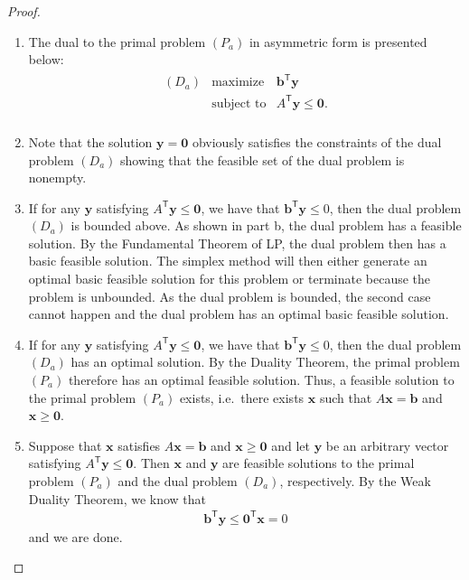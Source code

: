 \documentclass[12pt]{article}
\theoremstyle{definition}
\newcommand{\vc}[1]{\boldsymbol{#1}}
\newcommand{\tran}{\mathsf{T}}
\begin{document}
\begin{proof}
  \begin{enumerate}
    \item The dual to the primal problem $(P_a)$ in asymmetric form is presented below:
      \begin{align*}
        \begin{array}{rrl}
          (D_a) & \text{maximize} & \vc{b}^\tran\vc{y} \\
          & \text{subject to} & A^\tran \vc{y} \leq \vc{0}. \\
        \end{array}
      \end{align*}
    \item Note that the solution $\vc{y} = \vc{0}$ obviously satisfies the constraints
      of the dual problem $(D_a)$ showing that the feasible set of the dual problem is nonempty.
    \item If for any $\vc{y}$ satisfying $A^\tran \vc{y} \leq \vc{0}$,
      we have that $\vc{b}^\tran \vc{y} \leq 0$, then the dual problem $(D_a)$ is bounded above. As shown in part b,
      the dual problem has a feasible solution. By the Fundamental Theorem of LP, the dual
      problem then has a basic feasible solution. The simplex method
      will then either generate an optimal basic feasible solution for this problem or terminate because the problem is unbounded.
      As the dual problem is bounded, the second case cannot happen and the dual problem has an optimal basic feasible solution.
    \item If for any $\vc{y}$ satisfying $A^\tran \vc{y} \leq \vc{0}$,
      we have that $\vc{b}^\tran \vc{y} \leq 0$, then the dual problem $(D_a)$ has an optimal solution. By the Duality Theorem,
      the primal problem $(P_a)$ therefore has an optimal feasible solution. Thus, a feasible solution to the primal
      problem $(P_a)$ exists, i.e.\ there exists $\vc{x}$ such that $A\vc{x} = \vc{b}$ and $\vc{x} \geq \vc{0}$.
    \item Suppose that $\vc{x}$ satisfies $A\vc{x} = \vc{b}$ and $\vc{x} \geq \vc{0}$ and
      let $\vc{y}$ be an arbitrary vector satisfying $A^\tran \vc{y} \leq \vc{0}$.
      Then $\vc{x}$ and $\vc{y}$ are feasible solutions to the primal problem $(P_a)$ and the dual
      problem $(D_a)$, respectively. By the Weak Duality Theorem, we know that
      \begin{align*}
        \vc{b}^\tran \vc{y} \leq \vc{0}^\tran \vc{x} = 0
      \end{align*}
      and we are done.
  \end{enumerate}
\end{proof}
\newpage
\end{document}
